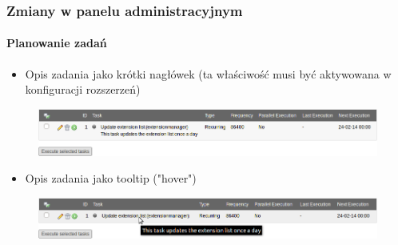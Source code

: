 
\begin{frame}[fragile]
	\frametitle{Zmiany w panelu administracyjnym}
	\framesubtitle{Planowanie zadań}

	\begin{itemize}
		\item Opis zadania jako krótki nagłówek\newline
			\small(ta właściwość musi być aktywowana w konfiguracji rozszerzeń)\normalsize
	\end{itemize}

	\begin{figure}
		\includegraphics[width=0.95\linewidth]{Images/BackendChanges/SchedulerTaskDescriptionAsSubheader.png}
	\end{figure}

	\begin{itemize}
		\item Opis zadania jako tooltip ("hover")
	\end{itemize}

	\begin{figure}
		\includegraphics[width=0.95\linewidth]{Images/BackendChanges/SchedulerTaskDescriptionAsTooltip.png}
	\end{figure}

\end{frame}


